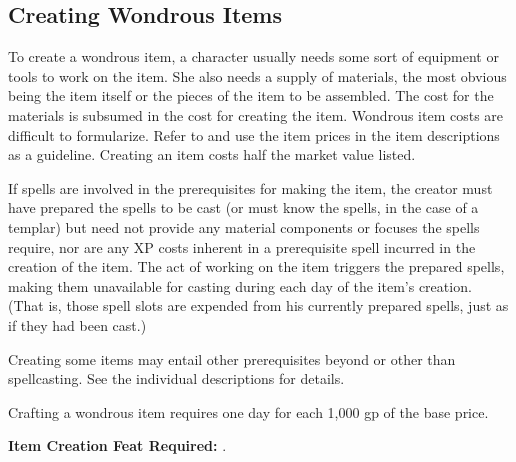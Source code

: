 \subsection{Creating Wondrous Items}
To create a wondrous item, a character usually needs some sort of equipment or tools to work on the item. She also needs a supply of materials, the most obvious being the item itself or the pieces of the item to be assembled. The cost for the materials is subsumed in the cost for creating the item. Wondrous item costs are difficult to formularize. Refer to  and use the item prices in the item descriptions as a guideline. Creating an item costs half the market value listed.

If spells are involved in the prerequisites for making the item, the creator must have prepared the spells to be cast (or must know the spells, in the case of a templar) but need not provide any material components or focuses the spells require, nor are any XP costs inherent in a prerequisite spell incurred in the creation of the item. The act of working on the item triggers the prepared spells, making them unavailable for casting during each day of the item's creation. (That is, those spell slots are expended from his currently prepared spells, just as if they had been cast.)

Creating some items may entail other prerequisites beyond or other than spellcasting. See the individual descriptions for details.

Crafting a wondrous item requires one day for each 1,000 gp of the base price.

\textbf{Item Creation Feat Required:} .
